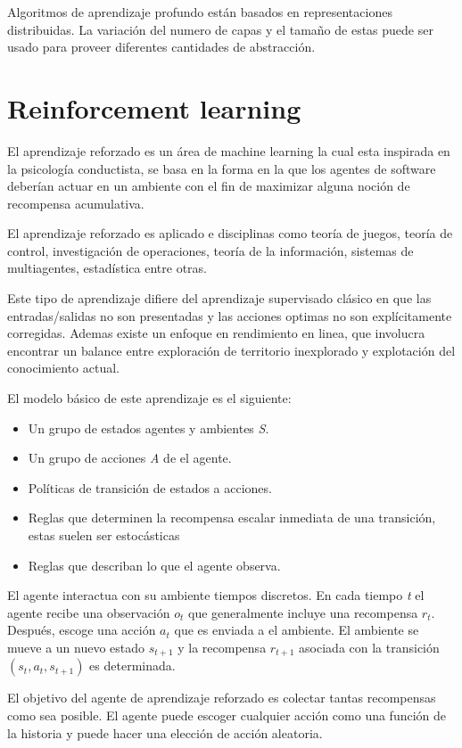 \documentclass{article}
\begin{document}
Algoritmos de aprendizaje profundo están basados en representaciones distribuidas. La variación del numero de capas y el tamaño de estas puede ser usado para proveer diferentes cantidades de abstracción.
\newpage
\section{Reinforcement learning}
El aprendizaje reforzado es un área de machine learning la cual esta inspirada en la psicología conductista, se basa en la forma en la que los agentes de software deberían actuar en un ambiente con el fin de maximizar alguna noción de recompensa acumulativa.

El aprendizaje reforzado es aplicado e disciplinas como teoría de juegos, teoría de control, investigación de operaciones, teoría de la información, sistemas de multiagentes, estadística entre otras.

Este tipo de aprendizaje difiere del aprendizaje supervisado clásico en que las entradas/salidas no son presentadas y las acciones optimas no son explícitamente corregidas. Ademas existe un enfoque en rendimiento en linea, que involucra encontrar un balance entre exploración de territorio inexplorado y explotación del conocimiento actual.

El modelo básico de este aprendizaje es el siguiente:
\begin{itemize}
	\item Un grupo de estados agentes y ambientes \emph{S}.
	\item Un grupo de acciones \emph{A} de el agente.
	\item Políticas de transición de estados a acciones.
	\item Reglas que determinen la recompensa escalar inmediata de una transición, estas suelen ser estocásticas
	\item Reglas que describan lo que el agente observa.
\end{itemize}

El agente interactua con su ambiente tiempos discretos. En cada tiempo \emph{t} el agente recibe una observación \emph{$o_{t}$} que generalmente incluye una recompensa \emph{$r_{t}$}. Después, escoge una acción \emph{$a_{t}$} que es enviada a el ambiente. El ambiente se mueve a un nuevo estado \emph{$s_{t+1}$} y la recompensa \emph{$r_{t+1}$} asociada con la transición \emph{$(s_{t}, a_{t}, s_{t+1})$} es determinada.

El objetivo del agente de aprendizaje reforzado es colectar tantas recompensas como sea posible. El agente puede escoger cualquier acción como una función de la historia y puede hacer una elección de acción aleatoria.
\end{document}
